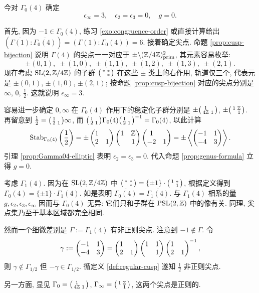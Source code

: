\begin{example}\label{eg:Gamma04-genus}
	今对 $\Gamma_0(4)$ 确定
	\[ \epsilon_\infty = 3, \quad \epsilon_2 = \epsilon_3 = 0, \quad g = 0. \]

	首先, 因为 $-1 \in \Gamma_0(4)$, 练习 \ref{exo:congruence-order} 或直接计算给出 $\left(\overline{\Gamma(1)} : \overline{\Gamma_0(4)}\right) = \left(\Gamma(1) : \Gamma_0(4)\right) = 6$. 接着确定尖点. 命题 \ref{prop:cusp-bijection} 说明 $\Gamma(4)$ 的尖点一一对应于 $\pm \backslash (\mathbb{Z}/4\mathbb{Z})^2_{\mathrm{prim}}$, 其元素容易枚举:
	\[ \pm(0, 1), \; \pm(1, 0), \; \pm(1, 1), \; \pm(1, 2), \; \pm (1, 3), \; \pm(2, 1). \]
	现在考虑 $\operatorname{SL}(2, \mathbb{Z}/4\mathbb{Z})$ 的子群 $\bigl(\begin{smallmatrix} * & * \\  & * \end{smallmatrix}\bigr)$ 在这些 $\pm$ 类上的右作用, 轨道仅三个, 代表元是 $\pm(0, 1)$, $\pm(1, 0)$, $\pm(2, 1)$; 按命题 \ref{prop:cusp-bijection} 对应的尖点分别是 $\infty$, $0$, $\frac{1}{2}$. 这就说明 $\epsilon_\infty = 3$.

	容易进一步确定 $0, \infty$ 在 $\Gamma_0(4)$ 作用下的稳定化子群分别是 $\pm\bigl(\begin{smallmatrix} 1 &  \\ 4\mathbb{Z} & 1 \end{smallmatrix}\bigr)$, $\pm\bigl(\begin{smallmatrix} 1 & \mathbb{Z} \\  & 1 \end{smallmatrix}\bigr)$. 再留意到 $\frac{1}{2} = \bigl(\begin{smallmatrix} 1 &  \\ 2 & 1 \end{smallmatrix}\bigr) \infty$, 而 $\bigl(\begin{smallmatrix} 1 &  \\ 2 & 1 \end{smallmatrix}\bigr) \Gamma_0(4) \bigl(\begin{smallmatrix} 1 &  \\ 2 & 1 \end{smallmatrix}\bigr)^{-1} =  \Gamma_0(4)$, 以此计算
	\[ \operatorname{Stab}_{\Gamma_0(4)}\left(\frac{1}{2}\right) = \pm\begin{pmatrix} 1 &  \\ 2 & 1 \end{pmatrix} \begin{pmatrix} 1 & \mathbb{Z} \\  & 1 \end{pmatrix} \begin{pmatrix} 1 &  \\ -2 & 1 \end{pmatrix} = \pm\left\langle  \begin{pmatrix} -1 & 1 \\ -4 & 3 \end{pmatrix}  \right\rangle. \]
	引理 \ref{prop:Gamma04-elliptic} 表明 $\epsilon_2 = \epsilon_3 = 0$. 代入命题 \ref{prop:genus-formula} 立得 $g = 0$.
\end{example}

\begin{example}\label{eg:Gamma14-genus}
	考虑 $\Gamma_1(4)$. 因为在 $\operatorname{SL}(2, \mathbb{Z}/4\mathbb{Z})$ 中 $\bigl(\begin{smallmatrix} * & * \\  & * \end{smallmatrix}\bigr) = \{\pm 1\} \cdot \bigl(\begin{smallmatrix} 1 & * \\  & 1 \end{smallmatrix}\bigr)$, 根据定义得到 $\Gamma_0(4) = \{\pm 1\} \cdot \Gamma_1(4)$. 如是表明 $\overline{\Gamma_0(4)} = \overline{\Gamma_1(4)}$. 与 $\Gamma_1(4)$ 相系的量 $g, \epsilon_2, \epsilon_3, \epsilon_\infty$ 因而与 $\Gamma_0(4)$ 无异: 它们只和子群在 $\operatorname{PSL}(2,\mathbb{Z})$ 中的像有关. 同理, 尖点集乃至于基本区域都完全相同.

	然而一个细微差别是 $\Gamma := \Gamma_1(4)$ 有非正则尖点. 注意到 $-1 \notin \Gamma$. 令
	\[ \gamma := \begin{pmatrix} -1 & 1 \\ -4 & 3 \end{pmatrix} = \begin{pmatrix} 1 &  \\ 2 & 1 \end{pmatrix} \begin{pmatrix} 1 & 1 \\  & 1 \end{pmatrix} \begin{pmatrix} 1 &  \\ 2 & 1 \end{pmatrix}^{-1}, \]
	则 $\gamma \notin \Gamma_{1/2}$ 但 $-\gamma \in \Gamma_{1/2}$. 循定义 \ref{def:regular-cusp} 遂知 $\frac{1}{2}$ 非正则尖点.
	
	另一方面, 显见 $\Gamma_0 = \bigl(\begin{smallmatrix} 1 &  \\ 4\mathbb{Z} & 1 \end{smallmatrix}\bigr)$, $\Gamma_\infty = \bigl(\begin{smallmatrix} 1 & \mathbb{Z} \\  & 1 \end{smallmatrix}\bigr)$, 这两个尖点是正则的.
\end{example}

